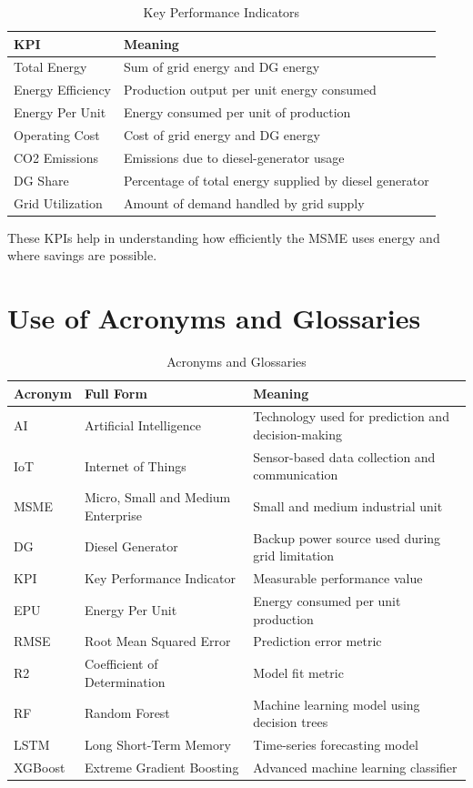 \begin{table}[htbp]
\centering
\caption{Key Performance Indicators}
\label{tab:kpi_list}
\begin{tabular}{|l|p{8cm}|}
\hline
\textbf{KPI} & \textbf{Meaning} \\
\hline
Total Energy & Sum of grid energy and DG energy \\
Energy Efficiency & Production output per unit energy consumed \\
Energy Per Unit & Energy consumed per unit of production \\
Operating Cost & Cost of grid energy and DG energy \\
CO2 Emissions & Emissions due to diesel-generator usage \\
DG Share & Percentage of total energy supplied by diesel generator \\
Grid Utilization & Amount of demand handled by grid supply \\
\hline
\end{tabular}
\end{table}

These KPIs help in understanding how efficiently the MSME uses energy and where savings are possible.

\section{Use of Acronyms and Glossaries}
\begin{table}[htbp]
\centering
\caption{Acronyms and Glossaries}
\label{tab:acronyms}
\begin{tabular}{|l|l|p{6cm}|}
\hline
\textbf{Acronym} & \textbf{Full Form} & \textbf{Meaning} \\
\hline
AI & Artificial Intelligence & Technology used for prediction and decision-making \\
IoT & Internet of Things & Sensor-based data collection and communication \\
MSME & Micro, Small and Medium Enterprise & Small and medium industrial unit \\
DG & Diesel Generator & Backup power source used during grid limitation \\
KPI & Key Performance Indicator & Measurable performance value \\
EPU & Energy Per Unit & Energy consumed per unit production \\
RMSE & Root Mean Squared Error & Prediction error metric \\
R2 & Coefficient of Determination & Model fit metric \\
RF & Random Forest & Machine learning model using decision trees \\
LSTM & Long Short-Term Memory & Time-series forecasting model \\
XGBoost & Extreme Gradient Boosting & Advanced machine learning classifier \\
\hline
\end{tabular}
\end{table}
